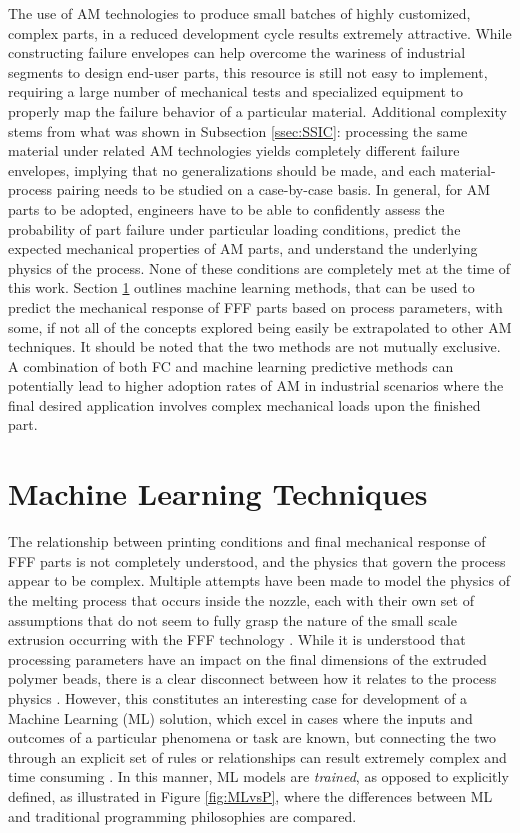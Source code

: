 \documentclass[main.tex]{subfiles}
\begin{document}
The use of AM technologies to produce small batches of highly customized, complex parts, in a reduced development cycle results extremely attractive. While constructing failure envelopes can help overcome the wariness of industrial segments to design end-user parts, this resource is still not easy to implement, requiring a large number of mechanical tests and specialized equipment to properly map the failure behavior of a particular material. Additional complexity stems from what was shown in Subsection \ref{ssec:SSIC}: processing the same material under related AM technologies yields completely different failure envelopes, implying that no generalizations should be made, and each material-process pairing needs to be studied on a case-by-case basis. In general, for AM parts to be adopted, engineers have to be able to confidently assess the probability of part failure under particular loading conditions, predict the expected mechanical properties of AM parts, and understand the underlying physics of the process. None of these conditions are completely met at the time of this work. Section \ref{sec:ml} outlines  machine learning methods, that can be used to predict the mechanical response of FFF parts based on process parameters, with some, if not all of the concepts explored being easily be extrapolated to other AM techniques. It should be noted that the two methods are not mutually exclusive. A combination of both FC and machine learning predictive methods can potentially lead to higher adoption rates of AM in industrial scenarios where the final desired application involves complex mechanical loads upon the finished part.

\section{Machine Learning Techniques} \label{sec:ml}

The relationship between printing conditions and final mechanical response of FFF parts is not completely understood, and the physics that govern the process appear to be complex. Multiple attempts have been made to model the physics of the melting process that occurs inside the nozzle, each with their own set of assumptions that do not seem to fully grasp the nature of the small scale extrusion occurring with the FFF technology \cite{ColonQuintana2020}. While it is understood that processing parameters have an impact on the final dimensions of the extruded polymer beads, there is a clear disconnect between how it relates to the process physics \cite{Koch2017}. However, this constitutes an interesting case for development of a Machine Learning (ML) solution, which excel in cases where the inputs and outcomes of a particular phenomena or task are known, but connecting the two through an explicit set of rules or relationships can result extremely complex and time consuming \cite{Chollet2018}. In this manner, ML models are \emph{trained}, as opposed to explicitly defined, as illustrated in Figure \ref{fig:MLvsP}, where the differences between ML and traditional programming philosophies are compared. 
\end{document}

